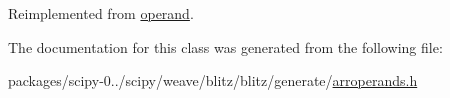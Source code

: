 Reimplemented from \hyperlink{classoperand_ac115fcfedc902b68a278d5534194d10c}{operand}.



The documentation for this class was generated from the following file\+:\begin{DoxyCompactItemize}
\item 
packages/scipy-\/0../scipy/weave/blitz/blitz/generate/\hyperlink{arroperands_8h}{arroperands.\+h}\end{DoxyCompactItemize}
